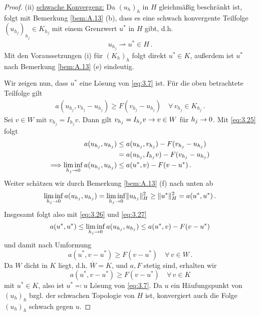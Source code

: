 \begin{itemize}
\begin{proof}
(ii) \underline{schwache Konvergenz:} Da $(u_h)_h$ in $H$ gleichmäßig beschränkt ist, folgt mit Bemerkung \ref{bem:A.13} (b), dass es eine schwach konvergente Teilfolge $(u_{h_j})_{h_j} \in K_{h_j}$ mit einem Grenzwert $u^*$ in $H$ gibt, d.h.
\[
	u_{h_j} \rightharpoonup u^* \in H \, .
\]
Mit den Voraussetzungen (i) für $(K_h)_h$ folgt direkt $u^* \in K$, außerdem ist $u^*$ nach Bemerkung \ref{bem:A.13} (e) eindeutig.

Wir zeigen nun, dass $u^*$ eine Lösung von \eqref{eq:3.7} ist. Für die oben betrachtete Teilfolge gilt
\begin{align}\label{eq:3.25}
	a(u_{h_j},v_{h_j}-u_{h_j})\ge F(v_{h_j}-u_{h_j}) \quad \forall \, v_{h_j} \in K_{h_j} \, .
\end{align}
Sei $v \in W$ mit $v_{h_j} = I_{h_j} v$. Dann gilt $v_{h_j} = I_{h_j} v \rightarrow v \in W$ für $h_j \rightarrow 0$. Mit \eqref{eq:3.25} folgt
\begin{align}
	\notag a(u_{h_j},u_{h_j}) &\le a(u_{h_j},v_{h_j})-F(v_{h_j}-u_{h_j}) \\
	\notag & = a(u_{h_j},I_{h_j} v)-F(v_{h_j}-u_{h_j}) \\
	\label{eq:3.26} \Longrightarrow \liminf_{h_j\rightarrow 0} a(u_{h_j},u_{h_j}) & \le  a(u^*,v)-F(v-u^*) \, .
\end{align}
Weiter schätzen wir durch Bemerkung \ref{bem:A.13} (f) nach unten ab
\begin{align}\label{eq:3.27}
	\liminf_{h_j\rightarrow 0} a(u_{h_j},u_{h_j}) = \liminf_{h_j\rightarrow 0} \lVert u_{h_j}\rVert_H^2 \ge \lVert u^*\rVert_H^2 = a(u^*,u^*) \, .
\end{align}
Insgesamt folgt also mit \eqref{eq:3.26} und \eqref{eq:3.27}
\[
	a(u^*,u^*) \le \liminf_{h_j\rightarrow 0} a(u_{h_j},u_{h_j}) \le   a(u^*,v)-F(v-u^*)
\]
und damit nach Umformung
\[
	a(u^*,v-u^*)\ge F(v-u^*) \quad \forall \, v \in W \, .
\]
Da $W$ dicht in $K$ liegt, d.h. $\overline W = K$, und $a, F$ stetig sind, erhalten wir
\[
	a(u^*,v-u^*)\ge F(v-u^*) \quad \forall \, v \in K 
\]
mit $u^*\in K$, also ist $u^*\eqqcolon u$ Lösung von \eqref{eq:3.7}. Da $u$ ein Häufungspunkt von $(u_h)_h$ bzgl. der schwachen Topologie von $H$ ist, konvergiert auch die Folge $(u_h)_h$ schwach gegen $u$.


\end{proof}
\end{itemize}
